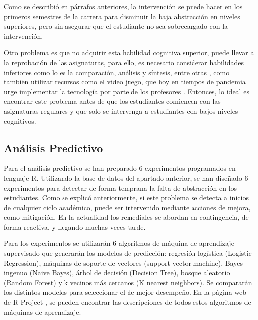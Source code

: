 \documentclass[spanish]{textolivre}
\begin{document}
Como se describió en párrafos anteriores, la intervención se puede hacer en los primeros semestres de la carrera para disminuir la baja abstracción en niveles superiores, pero sin asegurar que el estudiante no sea sobrecargado con la intervención.

Otro problema es que no adquirir esta habilidad cognitiva superior, puede llevar a la reprobación de las asignaturas, para ello, es necesario considerar habilidades inferiores como lo es la comparación, análisis y síntesis, entre otras \cite{beas2014, aravenagaete2021},  %
como también utilizar recursos como el video juego, que hoy en tiempos de pandemia urge implementar la tecnología por parte de los profesores \cite{aznardiaz2017}. %
Entonces, lo ideal es encontrar este problema antes de que los estudiantes comiencen con las asignaturas regulares y que solo se intervenga a estudiantes con bajos niveles cognitivos.

\subsection{Análisis Predictivo}
Para el análisis predictivo se han preparado 6 experimentos programados en lenguaje R. \cite{chambers1992} %
Utilizando la base de datos del apartado anterior, se han diseñado 6 experimentos para detectar de forma temprana la falta de abstracción en los estudiantes. Como se explicó anteriormente, si este problema se detecta a inicios de cualquier ciclo académico, puede ser intervenido mediante acciones de mejora, como mitigación. En la actualidad los remediales se abordan en contingencia, de forma reactiva, y llegando muchas veces tarde.

Para los experimentos se utilizarán 6 algoritmos de máquina de aprendizaje supervisado que generarán los modelos de predicción: regresión logística (Logistic Regression), máquinas de soporte de vectores (support vector machine), Bayes ingenuo (Naive Bayes),  árbol de decisión (Decision Tree), bosque aleatorio (Random Forest) y k vecinos más cercanos (K nearest neighbors). Se compararán los distintos modelos para seleccionar el de mejor desempeño. En la página web de R-Project \cite{chambers1992}, %
se pueden encontrar las descripciones de todos estos algoritmos de máquinas de aprendizaje.
\end{document}
